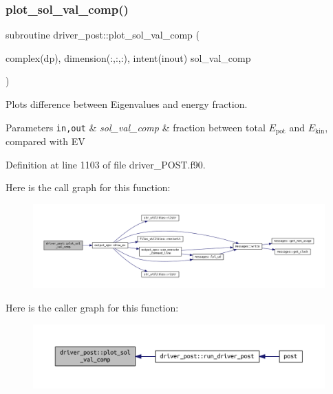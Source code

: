 \subsubsection{\texorpdfstring{plot\+\_\+sol\+\_\+val\+\_\+comp()}{plot\_sol\_val\_comp()}}
{\footnotesize\ttfamily subroutine driver\+\_\+post\+::plot\+\_\+sol\+\_\+val\+\_\+comp (\begin{DoxyParamCaption}\item[{complex(dp), dimension(\+:,\+:,\+:), intent(inout)}]{sol\+\_\+val\+\_\+comp }\end{DoxyParamCaption})}



Plots difference between Eigenvalues and energy fraction. 


\begin{DoxyParams}[1]{Parameters}
\mbox{\tt in,out}  & {\em sol\+\_\+val\+\_\+comp} & fraction between total $E_{\text{pot}}$ and $E_{\text{kin}}$, compared with EV \\
\hline
\end{DoxyParams}


Definition at line 1103 of file driver\+\_\+\+P\+O\+S\+T.\+f90.

Here is the call graph for this function\+:\nopagebreak
\begin{figure}[H]
\begin{center}
\leavevmode
\includegraphics[width=350pt]{namespacedriver__post_af9ce961d2d6825b767a93fdbe8806a1c_cgraph}
\end{center}
\end{figure}
Here is the caller graph for this function\+:\nopagebreak
\begin{figure}[H]
\begin{center}
\leavevmode
\includegraphics[width=350pt]{namespacedriver__post_af9ce961d2d6825b767a93fdbe8806a1c_icgraph}
\end{center}
\end{figure}
\mbox{\label{namespacedriver__post_a33b3c6f9018a0ddc92dce77394b8ab37}} 
